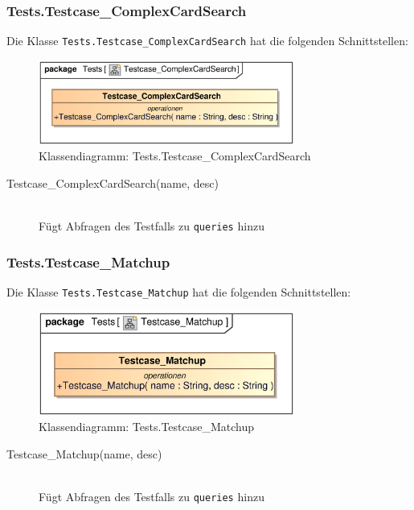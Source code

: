 \subsubsection{Tests.Testcase\_ComplexCardSearch}
Die Klasse \verb|Tests.Testcase_ComplexCardSearch| hat die folgenden Schnittstellen:
\begin{figure}[H]
    \myfloatalign
    \includegraphics[width=0.75\textwidth]{gfx/MtGDeepAnalysis/Testcase_ComplexCardSearch.eps}
    \caption{Klassendiagramm: Tests.Testcase\_ComplexCardSearch}
    \label{fig:class:tests.Testcase_ComplexCardSearch}
\end{figure}
\begin{description}
    \item[Testcase\_ComplexCardSearch(name, desc)] \hfill \\
    Fügt Abfragen des Testfalls zu \verb|queries| hinzu
\end{description}

\subsubsection{Tests.Testcase\_Matchup}
Die Klasse \verb|Tests.Testcase_Matchup| hat die folgenden Schnittstellen:
\begin{figure}[H]
    \myfloatalign
    \includegraphics[width=0.75\textwidth]{gfx/MtGDeepAnalysis/Testcase_Matchup.eps}
    \caption{Klassendiagramm: Tests.Testcase\_Matchup}
    \label{fig:class:tests.Testcase_Matchup}
\end{figure}
\begin{description}
    \item[Testcase\_Matchup(name, desc)] \hfill \\
    Fügt Abfragen des Testfalls zu \verb|queries| hinzu
\end{description}

